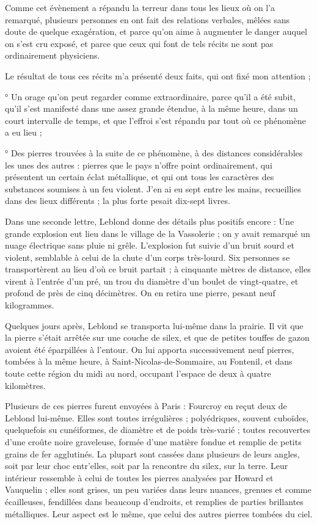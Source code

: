 \documentclass[a4paper, 12pt, oneside, french]{article}
\begin{document}
\og Comme cet évènement a répandu la terreur dans tous les lieux où on l'a remarqué, plusieurs personnes en ont fait des relations verbales, mêlées sans doute de quelque exagération, et parce qu'on aime à augmenter le danger auquel on s'est cru exposé, et parce que ceux qui font de tels récits ne sont pas ordinairement physiciens. \fg

\og Le résultat de tous ces récits m'a présenté deux faits, qui ont fixé mon attention ; \fg

° Un orage qu'on peut regarder comme extraordinaire, parce qu'il a été subit, qu'il s'est manifesté dans une assez grande étendue, à la même heure, dans un court intervalle de temps, et que l'effroi s'est répandu par tout où ce phénomène a eu lieu ; \fg

° Des pierres trouvées à la suite de ce phénomène, à des distances considérables les unes des autres : pierres que le pays n'offre point ordinairement, qui présentent un certain éclat métallique, et qui ont tous les caractères des substances soumises à un feu violent. J'en ai eu sept entre les mains, recueillies dans des lieux différents ; la plus forte pesait dix-sept livres. \fg

Dans une seconde lettre, Leblond donne des détails plus positifs encore : \og Une grande explosion eut lieu dans le village de la Vassolerie ; on y avait remarqué un nuage électrique sans pluie ni grêle. L'explosion fut suivie d'un bruit sourd et violent, semblable à celui de la chute d'un corps très-lourd. Six personnes se transportèrent au lieu d'où ce bruit partait ; à cinquante mètres de distance, elles virent à l'entrée d'un pré, un trou du diamètre d'un boulet de vingt-quatre, et profond de près de cinq décimètres. On en retira une pierre, pesant neuf kilogrammes. \fg

Quelques jours après, Leblond se transporta lui-même dans la prairie. Il vit que la pierre s'était arrêtée sur une couche de silex, et que de petites touffes de gazon avoient été éparpillées à l'entour. On lui apporta successivement neuf pierres, tombées à la même heure, à Saint-Nicolas-de-Sommaire, au Fontenil, et dans toute cette région du midi au nord, occupant l'espace de deux à quatre kilomètres.

Plusieurs de ces pierres furent envoyées à Paris : Fourcroy en reçut deux de Leblond lui-même. Elles sont toutes irrégulières ; polyédriques, souvent cuboïdes, quelquefois su cunéiformes, de diamètre et de poids très-varié ; toutes recouvertes d'une croûte noire graveleuse, formée d'une matière fondue et remplie de petits grains de fer agglutinés. La plupart sont cassées dans plusieurs de leurs angles, soit par leur choc entr'elles, soit par la rencontre du silex, sur la terre. Leur intérieur ressemble à celui de toutes les pierres analysées par Howard et Vauquelin ; elles sont grises, un peu variées dans leurs nuances, grenues et comme écailleuses, fendillées dans beaucoup d'endroits, et remplies de parties brillantes métalliques. Leur aspect est le même, que celui des autres pierres tombées du ciel.
\end{document}

